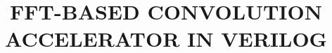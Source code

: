 \documentclass[12pt,twoside,a4paper]{hcmut_report}
\title{FFT-BASED CONVOLUTION ACCELERATOR IN VERILOG}
\begin{document}
\coverpage
% 






\printbibliography
\end{document}
